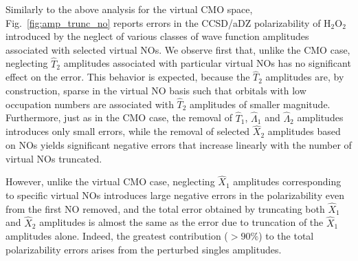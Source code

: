 \documentclass[journal=jpccck,manuscript=article]{achemso}
\begin{document}
Similarly to the above analysis for the virtual CMO space,
Fig.~\ref{fig:amp_trunc_no} reports errors in the CCSD/aDZ polarizability of
H$_2$O$_2$ introduced by the neglect of various classes of wave function
amplitudes associated with selected virtual NOs.  We observe first that,
unlike the CMO case, neglecting $\hat{T}_2$ amplitudes associated with
particular virtual NOs has no significant effect on the error.  This behavior
is expected, because the $\hat{T}_2$ amplitudes are, by construction, sparse
in the virtual NO basis such that orbitals with low occupation numbers are
associated with $\hat{T}_2$ amplitudes of smaller magnitude.  Furthermore,
just as in the CMO case, the removal of $\hat{T}_1$, $\hat{\Lambda}_1$ and
$\hat{\Lambda}_2$ amplitudes introduces only small errors, while the removal
of selected $\hat{X}_2$ amplitudes based on NOs yields significant negative
errors that increase linearly with the number of virtual NOs truncated.

However, unlike the virtual CMO case, neglecting $\hat{X}_1$ amplitudes
corresponding to specific virtual NOs introduces large negative errors in the
polarizability even from the first NO removed, and the total error obtained by
truncating both $\hat{X}_1$ and $\hat{X}_2$ amplitudes is almost the same as
the error due to truncation of the $\hat{X}_1$ amplitudes alone.  Indeed, 
the greatest contribution ($>90\%$) to the
total polarizability errors arises from the perturbed singles amplitudes.
\end{document}
